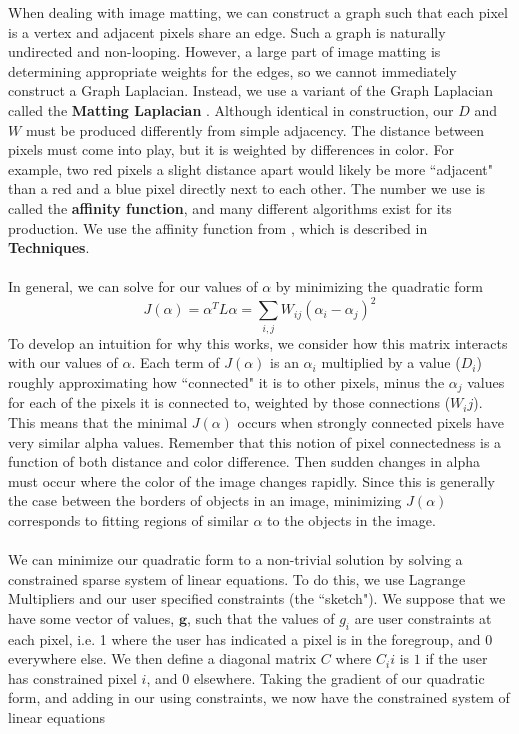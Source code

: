 When dealing with image matting, we can construct a graph such that each pixel is a vertex and adjacent pixels share an edge. Such a graph is naturally undirected and non-looping. However, a large part of image matting is determining appropriate weights for the edges, so we cannot immediately construct a Graph Laplacian. Instead, we use a variant of the Graph Laplacian called the \textbf{Matting Laplacian} \cite{levin08}.
Although identical in construction, our $D$ and $W$ must be produced differently from simple adjacency. The distance between pixels must come into play, but it is weighted by differences in color. For example, two red pixels a slight distance apart would likely be more ``adjacent" than a red and a blue pixel directly next to each other. The number we use is called the \textbf{affinity function}, and many different algorithms exist for its production. We use the affinity function from \cite{levin08}, which is described in \textbf{Techniques}.
\\\\
In general, we can solve for our values of $\alpha$ by minimizing the quadratic form
\[J(\alpha)=\alpha^T L\alpha=\sum_{i,j}W_{ij}(\alpha_i-\alpha_j)^2\]
To develop an intuition for why this works, we consider how this matrix interacts with our values of $\alpha$. Each term of $J(\alpha)$ is an $\alpha_i$ multiplied by a value ($D_i$) roughly approximating how ``connected" it is to other pixels, minus the $\alpha_j$ values for each of the pixels it is connected to, weighted by those connections ($W_ij$). This means that the minimal $J(\alpha)$ occurs when strongly connected pixels have very similar alpha values. Remember that this notion of pixel connectedness is a function of both distance and color difference. Then sudden changes in alpha must occur where the color of the image changes rapidly. Since this is generally the case between the borders of objects in an image, minimizing $J(\alpha)$ corresponds to fitting regions of similar $\alpha$ to the objects in the image.
\\\\
We can minimize our quadratic form to a non-trivial solution by solving a constrained sparse system of linear equations.  To do this, we use Lagrange Multipliers and our user specified constraints (the ``sketch").
We suppose that we have some vector of values, $\textbf{g}$, such that the values of $g_i$ are user constraints at each pixel, i.e. 1 where the user has indicated a pixel is in the foregroup, and 0 everywhere else. We then define a diagonal matrix $C$ where $C_ii$ is $1$ if the user has constrained pixel $i$, and $0$ elsewhere. Taking the gradient of our quadratic form, and adding in our using constraints, we now have the constrained system of linear equations
